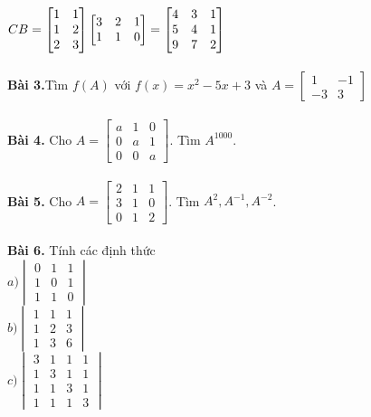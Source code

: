 \documentclass[12pt]{report}
\begin{document}
$CB = \begin{bmatrix} 1 & 1 \\ 1 & 2 \\ 2 & 3 \end{bmatrix} \begin{bmatrix} 3 & 2 & 1 \\ 1 & 1 & 0 \end{bmatrix} = \begin{bmatrix} 4 & 3 & 1 \\ 5 & 4 & 1 \\ 9 & 7 & 2 \end{bmatrix}\\$\\
\\ \textbf{Bài 3.}Tìm $f(A)$ với $f(x) = x^2 - 5x + 3$ và $A = \begin{bmatrix} 1 & -1 \\ -3 & 3 \end{bmatrix}$\\
\\ \textbf{Bài 4.} Cho $A = \begin{bmatrix} a & 1 & 0 \\ 0 & a & 1 \\ 0 & 0 & a \end{bmatrix}$. Tìm $A^{1000}$.\\
\\ \textbf{Bài 5.} Cho $A = \begin{bmatrix} 2 & 1 & 1 \\ 3 & 1 & 0 \\ 0 & 1 & 2 \end{bmatrix}$. Tìm $A^2, A^{-1}, A^{-2}$.\\
\\ \textbf{Bài 6.} Tính các định thức\\
$a)\begin{vmatrix} 0 & 1 & 1 \\ 1 & 0 & 1 \\ 1 & 1 & 0 \end{vmatrix}$\\
$b)\begin{vmatrix} 1 & 1 & 1 \\ 1 & 2 & 3 \\ 1 & 3 & 6 \end{vmatrix}$\\
$c)\begin{vmatrix} 3 & 1 & 1 & 1 \\ 1 & 3 & 1 & 1 \\ 1 & 1 & 3 & 1 \\ 1 & 1 & 1 & 3 \end{vmatrix}$\\
\end{document}
